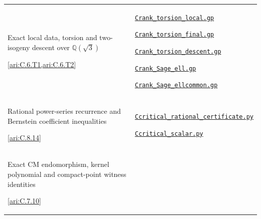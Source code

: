 {\begin{longtable}{@{}>{\raggedright\arraybackslash}p{}>{\raggedright\arraybackslash}p{}@{}}
\hypertarget{prog:I:torsion}{}Exact local data, torsion and two-isogeny descent over $\mathbb Q(\sqrt3)$\par \cref{ari:C.6.T1,ari:C.6.T2} &
\href{https://raw.githubusercontent.com/KokunoYumeto/s6-complex-structure-workbench/\SsixRepositoryCommit/pro_returns/S6_10_PAPERS_checkpoint_15_20261119T1045Z/S6_10_PAPERS/code/I/replay_torsion/Crank_torsion_local.gp}{\nolinkurl{Crank_torsion_local.gp}}\par \href{https://raw.githubusercontent.com/KokunoYumeto/s6-complex-structure-workbench/\SsixRepositoryCommit/pro_returns/S6_10_PAPERS_checkpoint_15_20261119T1045Z/S6_10_PAPERS/code/I/replay_torsion/Crank_torsion_final.gp}{\nolinkurl{Crank_torsion_final.gp}}\par \href{https://raw.githubusercontent.com/KokunoYumeto/s6-complex-structure-workbench/\SsixRepositoryCommit/pro_returns/S6_10_PAPERS_checkpoint_15_20261119T1045Z/S6_10_PAPERS/code/I/replay_torsion/Crank_torsion_descent.gp}{\nolinkurl{Crank_torsion_descent.gp}}\par \href{https://raw.githubusercontent.com/KokunoYumeto/s6-complex-structure-workbench/\SsixRepositoryCommit/pro_returns/S6_10_PAPERS_checkpoint_15_20261119T1045Z/S6_10_PAPERS/code/I/replay_torsion/Crank_Sage_ell.gp}{\nolinkurl{Crank_Sage_ell.gp}}\par \href{https://raw.githubusercontent.com/KokunoYumeto/s6-complex-structure-workbench/\SsixRepositoryCommit/pro_returns/S6_10_PAPERS_checkpoint_15_20261119T1045Z/S6_10_PAPERS/code/I/replay_torsion/Crank_Sage_ellcommon.gp}{\nolinkurl{Crank_Sage_ellcommon.gp}} \\[3pt]
\hypertarget{prog:I:critical}{}Rational power-series recurrence and Bernstein coefficient inequalities\par \cref{ari:C.8.14} &
\href{https://raw.githubusercontent.com/KokunoYumeto/s6-complex-structure-workbench/\SsixRepositoryCommit/pro_returns/S6_10_PAPERS_checkpoint_15_20261119T1045Z/S6_10_PAPERS/code/I/replay_arithmetic/Ccritical_rational_certificate.py}{\nolinkurl{Ccritical_rational_certificate.py}}\par \href{https://raw.githubusercontent.com/KokunoYumeto/s6-complex-structure-workbench/\SsixRepositoryCommit/pro_returns/S6_10_PAPERS_checkpoint_15_20261119T1045Z/S6_10_PAPERS/code/I/replay_arithmetic/Ccritical_scalar.py}{\nolinkurl{Ccritical_scalar.py}} \\[3pt]
\hypertarget{prog:I:cm_witness}{}Exact CM endomorphism, kernel polynomial and compact-point witness identities\par \cref{ari:C.7.10} &

\end{longtable}}
